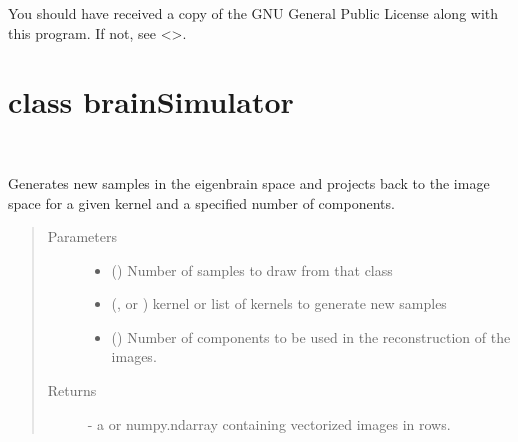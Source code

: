 \documentclass[letterpaper,10pt,english]{sphinxmanual}
\begin{document}
You should have received a copy of the GNU General Public License
along with this program.  If not, see \textless{}\textgreater{}.


\section{class brainSimulator}
\label{\detokenize{api:class-brainsimulator}}

\begin{fulllineitems}
\label{\detokenize{api:brainSimulator.BrainSimulator}}~

\begin{fulllineitems}
\label{\detokenize{api:brainSimulator.BrainSimulator.createNewBrains}}
Generates new samples in the eigenbrain space and projects back to 
the image space for a given kernel and a specified number of 
components.
\begin{quote}\begin{description}
\item[{Parameters}] \leavevmode\begin{itemize}
\item {} 
 () \textendash{} Number of samples to draw from that class

\item {} 
 (,  or         ) \textendash{} kernel or list of kernels to generate new samples

\item {} 
 () \textendash{} Number of components to be used in the         reconstruction of the images.

\end{itemize}

\item[{Returns}] \leavevmode
{} - a  or numpy.ndarray containing          vectorized images in rows.


\end{description}
\end{quote}
\end{fulllineitems}
\end{fulllineitems}
\end{document}
